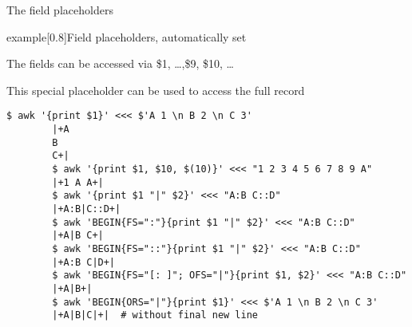 \begin{frame}[fragile]{The field placeholders}
    \vspace{-4mm}
    \begin{varblock}{example}[0.8\textwidth]{Field placeholders, automatically set}
        \begin{description}[XXXXXX]
            \item[\$n] The fields can be accessed via \$1, \ldots,\$9, \$10, \ldots
            \item[\$0] This special placeholder can be used to access the full record
        \end{description}
    \end{varblock}
    \begin{lstlisting}[style=MyBash, xleftmargin=3mm, xrightmargin=3mm]
        $ awk '{print $1}' <<< $'A 1 \n B 2 \n C 3'
        |+A
        B
        C+|
        $ awk '{print $1, $10, $(10)}' <<< "1 2 3 4 5 6 7 8 9 A"
        |+1 A A+|
        $ awk '{print $1 "|" $2}' <<< "A:B C::D"
        |+A:B|C::D+|
        $ awk 'BEGIN{FS=":"}{print $1 "|" $2}' <<< "A:B C::D"
        |+A|B C+|
        $ awk 'BEGIN{FS="::"}{print $1 "|" $2}' <<< "A:B C::D"
        |+A:B C|D+|
        $ awk 'BEGIN{FS="[: ]"; OFS="|"}{print $1, $2}' <<< "A:B C::D"
        |+A|B+|
        $ awk 'BEGIN{ORS="|"}{print $1}' <<< $'A 1 \n B 2 \n C 3'
        |+A|B|C|+|  # without final new line
    \end{lstlisting}
\end{frame}

